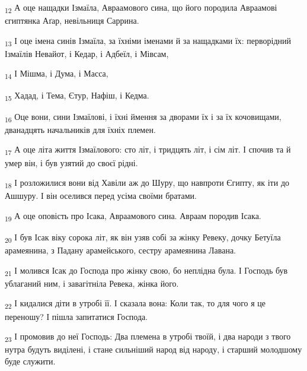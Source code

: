 \begin{tcolorbox}
\textsubscript{12} А оце нащадки Ізмаїла, Авраамового сина, що його породила Авраамові єгиптянка Аґар, невільниця Саррина.
\end{tcolorbox}
\begin{tcolorbox}
\textsubscript{13} І оце імена синів Ізмаїла, за їхніми іменами й за нащадками їх: перворідний Ізмаїлів Невайот, і Кедар, і Адбеїл, і Мівсам,
\end{tcolorbox}
\begin{tcolorbox}
\textsubscript{14} І Мішма, і Дума, і Масса,
\end{tcolorbox}
\begin{tcolorbox}
\textsubscript{15} Хадад, і Тема, Єтур, Нафіш, і Кедма.
\end{tcolorbox}
\begin{tcolorbox}
\textsubscript{16} Оце вони, сини Ізмаїлові, і їхні ймення за дворами їх і за їх кочовищами, дванадцять начальників для їхніх племен.
\end{tcolorbox}
\begin{tcolorbox}
\textsubscript{17} А оце літа життя Ізмаїлового: сто літ, і тридцять літ, і сім літ. І спочив та й умер він, і був узятий до своєї рідні.
\end{tcolorbox}
\begin{tcolorbox}
\textsubscript{18} І розложилися вони від Хавіли аж до Шуру, що навпроти Єгипту, як іти до Ашшуру. І він оселився перед усіма своїми братами.
\end{tcolorbox}
\begin{tcolorbox}
\textsubscript{19} А оце оповість про Ісака, Авраамового сина. Авраам породив Ісака.
\end{tcolorbox}
\begin{tcolorbox}
\textsubscript{20} І був Ісак віку сорока літ, як він узяв собі за жінку Ревеку, дочку Бетуїла арамеянина, з Падану арамейського, сестру арамеянина Лавана.
\end{tcolorbox}
\begin{tcolorbox}
\textsubscript{21} І молився Ісак до Господа про жінку свою, бо неплідна була. І Господь був ублаганий ним, і завагітніла Ревека, жінка його.
\end{tcolorbox}
\begin{tcolorbox}
\textsubscript{22} І кидалися діти в утробі її. І сказала вона: Коли так, то для чого я це переношу? І пішла запитатися Господа.
\end{tcolorbox}
\begin{tcolorbox}
\textsubscript{23} І промовив до неї Господь: Два племена в утробі твоїй, і два народи з твого нутра будуть виділені, і стане сильніший народ від народу, і старший молодшому буде служити.
\end{tcolorbox}
